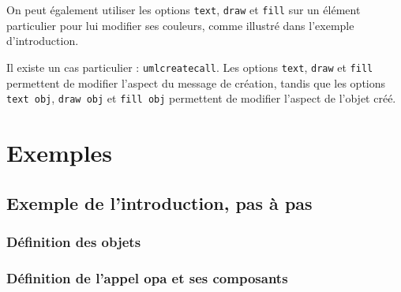 \documentclass[a4paper,11pt]{report}
\newcommand{\inputTikZ}[1]{%
  }%
\newcommand{\inputTikZ}[1]{%
    \texttt{[image: fig/\#1.pdf]}%
  }%
\begin{document}
On peut également utiliser les options {\tt text}, {\tt draw} et {\tt fill} sur un élément particulier pour lui modifier ses couleurs, comme illustré dans l'exemple d'introduction. 

Il existe un cas particulier : {\tt umlcreatecall}. Les options {\tt text}, {\tt draw} et {\tt fill} permettent de modifier l'aspect du message de création, tandis que les options {\tt text obj}, {\tt draw obj} et {\tt fill obj} permettent de modifier l'aspect de l'objet créé.

\medskip

\begin{minipage}{0.6\textwidth}

\end{minipage}
\begin{minipage}{0.4\textwidth}
\begin{center}
\inputTikZ{createcallset}
\end{center}
\end{minipage}

\section{Exemples}

\subsection{Exemple de l'introduction, pas à pas}

\subsubsection{Définition des objets}

{\color{red!70!black}
\vspace{-0.4cm}

}

\begin{center}
\inputTikZ{seqdiagstep1}
\end{center}

\subsubsection{Définition de l'appel opa et ses composants}
\end{document}
